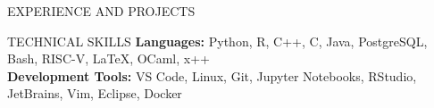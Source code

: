\documentclass{resume} %
\begin{document}
\begin{rSection}{EXPERIENCE AND PROJECTS}

 
 
\end{rSection} 
\vspace{-6pt}
\begin{rSection}{TECHNICAL SKILLS}
\textbf{Languages:} Python, R, C++, C, Java, PostgreSQL, Bash, RISC-V, LaTeX, OCaml, x++\\
\textbf{Development Tools:} VS Code, Linux, Git, Jupyter Notebooks, RStudio, JetBrains, Vim, Eclipse, Docker
\end{rSection}
\end{document}
